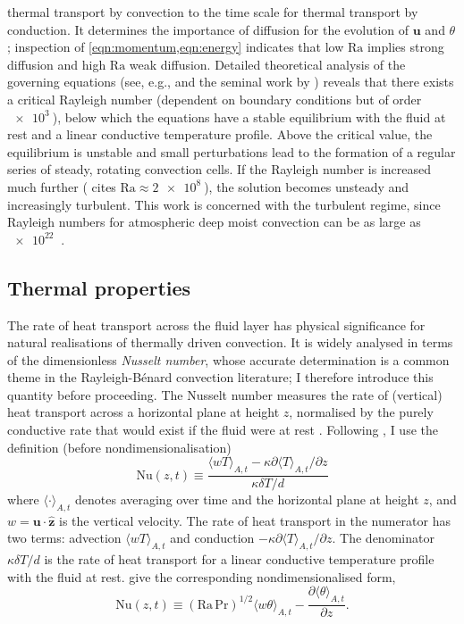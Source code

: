 \documentclass[titlepage]{article}
\numberwithin{equation}{section}
\newcommand{\pdiff}[2]{\frac{\partial #1}{\partial #2}}
\renewcommand\vec{\bm}
\newcommand{\uvec}[1]{\vec{\hat{#1}}}
\newcommand{\prandtl}{\ensuremath{\mathrm{Pr}}}
\newcommand{\rayleigh}{\ensuremath{\mathrm{Ra}}}
\newcommand{\nusselt}{\ensuremath{\mathrm{Nu}}}
\newcommand{\rb}{Rayleigh-B\'{e}nard}
\begin{document}
thermal transport by convection to the time scale for thermal transport by
conduction. It determines the importance of diffusion for the evolution of
$\vec{u}$ and $\theta$; inspection of \cref{eqn:momentum,eqn:energy} indicates
that low $\rayleigh$ implies strong diffusion and high $\rayleigh$ weak
diffusion. Detailed theoretical analysis of the governing equations (see, e.g.,
\textcite{chandrasekhar1961} and the seminal work by \textcite{rayleigh1916})
reveals that there exists a critical Rayleigh number (dependent on boundary
conditions but of order $\SI{e3}{}$), below which the equations have a stable
equilibrium with the fluid at rest and a linear conductive temperature profile.
Above the critical value, the equilibrium is unstable and small perturbations
lead to the formation of a regular series of steady, rotating convection cells.
If the Rayleigh number is increased much further (\textcite{le_quere1991} cites
$\rayleigh \approx \SI{2e8}{}$), the solution becomes unsteady and increasingly
turbulent. This work is concerned with the turbulent regime, since Rayleigh
numbers for atmospheric deep moist convection can be as large as $\SI{e22}{}$
\parencite{chilla2012}.

\subsection{Thermal properties}
The rate of heat transport across the fluid layer has physical significance for
natural realisations of thermally driven convection. It is widely analysed in
terms of the dimensionless \emph{Nusselt number}, whose accurate determination
is a common theme in the \rb{} convection literature; I therefore introduce
this quantity before proceeding. The Nusselt number measures the rate of
(vertical) heat transport across a horizontal plane at height $z$, normalised
by the purely conductive rate that would exist if the fluid were at rest
\parencite{verzicco1999}. Following \textcite{chilla2012}, I use the definition
(before nondimensionalisation)
\begin{equation}
    \label{eqn:dim_nusselt}
    \nusselt(z,t) \equiv \frac{
        \langle wT \rangle_{A,t}
        - \kappa \partial \langle T \rangle_{A,t} / \partial z
    }{
        \kappa \delta T / d
    }
\end{equation}
where $\langle \cdot \rangle_{A,t}$ denotes averaging over time and the
horizontal plane at height $z$, and $w = \vec{u} \cdot \uvec{z}$ is the
vertical velocity. The rate of heat transport in the numerator has two terms:
advection $\langle wT \rangle_{A,t}$ and conduction $-\kappa \partial \langle T
\rangle_{A,t} / \partial z$. The denominator $\kappa \delta T / d$ is the rate
of heat transport for a linear conductive temperature profile with the fluid at
rest. \textcite{scheel2013} give the corresponding nondimensionalised form,
\begin{equation}
    \label{eqn:nusselt}
    \nusselt(z,t) \equiv (\rayleigh\,\prandtl)^{1/2}
        \langle w \theta \rangle_{A,t}
        - \pdiff{\langle \theta \rangle_{A,t}}{z}.
\end{equation}
\end{document}
